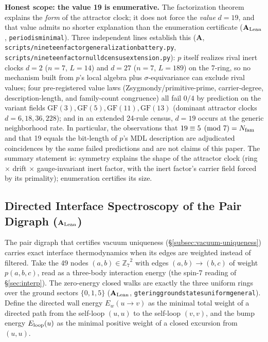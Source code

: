 \documentclass[11pt]{article}
\theoremstyle{remark}
\newcommand{\ZS}{\ensuremath{\mathbb{Z}_7}}
\newcommand{\GF}[1]{\ensuremath{\mathrm{GF}(#1)}}
\newcommand{\lean}[1]{%
  \penalty-100
  \begingroup\def\_{\textunderscore\allowbreak}\texttt{#1}\endgroup}
\newcommand{\CatA}{\textbf{A}}
\newcommand{\CatAL}{\texorpdfstring{\ensuremath{\textbf{A}_{\rm Lean}}}{A-Lean}}
\begin{document}
\medskip
\noindent\textbf{Honest scope: the value 19 is enumerative.}
The factorization theorem explains the \emph{form} of the attractor clock;
it does not force the \emph{value} $d = 19$, and that value admits no
shorter explanation than the enumeration certificate
(\CatAL{}, \lean{period\_475\_is\_minimal}). Three independent lines
establish this (\CatA{},
\lean{scripts/nineteen\_factor\_generalization\_battery.py},
\lean{scripts/nineteen\_factor\_null\_d\_census\_extension.py}):
$p$ itself realizes rival inert clocks $d = 2$ ($n = 7$, $L = 14$) and
$d = 27$ ($n = 7$, $L = 189$) on the 7-ring, so no mechanism built from
$p$'s local algebra plus $\sigma$-equivariance can exclude rival values;
four pre-registered value laws (Zsygmondy/primitive-prime, carrier-degree,
description-length, and family-count congruence) all fail $0/4$ by
prediction on the variant fields $\GF{3}, \GF{5}, \GF{11}, \GF{13}$
(dominant attractor clocks $d = 6, 18, 36, 228$); and in an extended
24-rule census, $d = 19$ occurs at the generic neighborhood rate. In
particular, the observations that $19 \equiv 5 \pmod 7 = N_{\rm fam}$ and
that 19 equals the bit-length of $p$'s MDL description are adjudicated
coincidences by the same failed predictions and are not claims of this
paper. The summary statement is: symmetry explains the shape of the
attractor clock (ring $\times$ drift $\times$ gauge-invariant inert
factor, with the inert factor's carrier field forced by its primality);
enumeration certifies its size.

\subsection{Directed Interface Spectroscopy of the Pair Digraph (\CatAL{})}
\label{subsec:wall-spectroscopy}

The pair digraph that certifies vacuum uniqueness
(§\ref{subsec:vacuum-uniqueness}) carries exact interface thermodynamics
when its edges are weighted instead of filtered. Take the 49 nodes
$(a,b) \in \ZS^2$ with edges $(a,b) \to (b,c)$ of weight $p(a,b,c)$, read
as a three-body interaction energy (the spin-7 reading of
§\ref{sec:interp}). The zero-energy closed walks are exactly the three
uniform rings over the ground sectors $\{0, 1, 5\}$ (\CatAL{},
\lean{gte\_ring\_ground\_states\_uniform\_general}). Define the directed
wall energy $E_w(u \to v)$ as the minimal total weight of a directed path
from the self-loop $(u,u)$ to the self-loop $(v,v)$, and the bump energy
$E_{\rm loop}(u)$ as the minimal positive weight of a closed excursion
from $(u,u)$.
\end{document}
